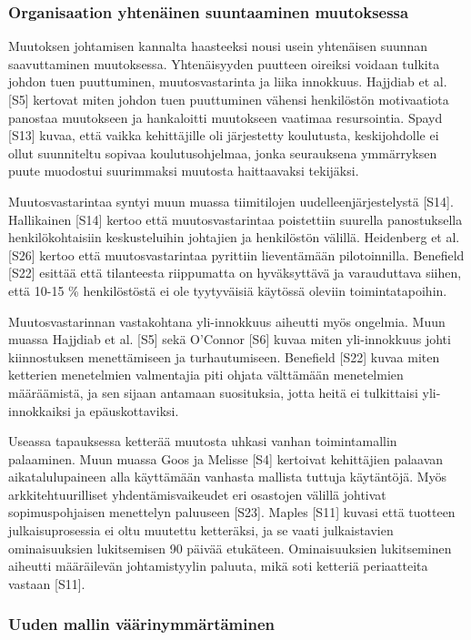 \subsubsection{Organisaation yhtenäinen suuntaaminen muutoksessa}

Muutoksen johtamisen kannalta haasteeksi nousi usein yhtenäisen suunnan
saavuttaminen muutoksessa. Yhtenäisyyden puutteen oireiksi voidaan tulkita
johdon tuen puuttuminen, muutosvastarinta ja liika innokkuus. Hajjdiab et al.
[S5] kertovat miten johdon tuen puuttuminen vähensi henkilöstön motivaatiota
panostaa muutokseen ja hankaloitti muutokseen vaatimaa resursointia. Spayd [S13]
kuvaa, että vaikka kehittäjille oli järjestetty koulutusta, keskijohdolle ei
ollut suunniteltu sopivaa koulutusohjelmaa, jonka seurauksena ymmärryksen
puute muodostui suurimmaksi muutosta haittaavaksi tekijäksi.

Muutosvastarintaa syntyi muun muassa tiimitilojen uudelleenjärjestelystä [S14].
Hallikainen [S14] kertoo että muutosvastarintaa poistettiin suurella
panostuksella henkilökohtaisiin keskusteluihin johtajien ja henkilöstön välillä.
Heidenberg et al. [S26] kertoo että muutosvastarintaa pyrittiin lieventämään
pilotoinnilla. Benefield [S22] esittää että tilanteesta riippumatta on
hyväksyttävä ja varauduttava siihen, että 10-15 \% henkilöstöstä ei ole
tyytyväisiä käytössä oleviin toimintatapoihin.

Muutosvastarinnan vastakohtana yli-innokkuus aiheutti myös ongelmia. Muun muassa
Hajjdiab et al. [S5] sekä O'Connor [S6] kuvaa miten yli-innokkuus johti 
kiinnostuksen menettämiseen ja turhautumiseen. Benefield [S22] kuvaa miten
ketterien menetelmien valmentajia piti ohjata välttämään menetelmien
määräämistä, ja sen sijaan antamaan suosituksia, jotta heitä ei tulkittaisi
yli-innokkaiksi ja epäuskottaviksi.

Useassa tapauksessa ketterää muutosta uhkasi vanhan toimintamallin palaaminen.
Muun muassa Goos ja Melisse [S4] kertoivat kehittäjien palaavan
aikatalulupaineen alla käyttämään vanhasta mallista tuttuja käytäntöjä. Myös
arkkitehtuurilliset yhdentämisvaikeudet eri osastojen välillä johtivat
sopimuspohjaisen menettelyn paluuseen [S23]. Maples [S11] kuvasi että tuotteen
julkaisuprosessia ei oltu muutettu ketteräksi, ja se vaati julkaistavien
ominaisuuksien lukitsemisen 90 päivää etukäteen. Ominaisuuksien lukitseminen
aiheutti määräilevän johtamistyylin paluuta, mikä soti ketteriä periaatteita
vastaan [S11].

\subsubsection{Uuden mallin väärinymmärtäminen}

